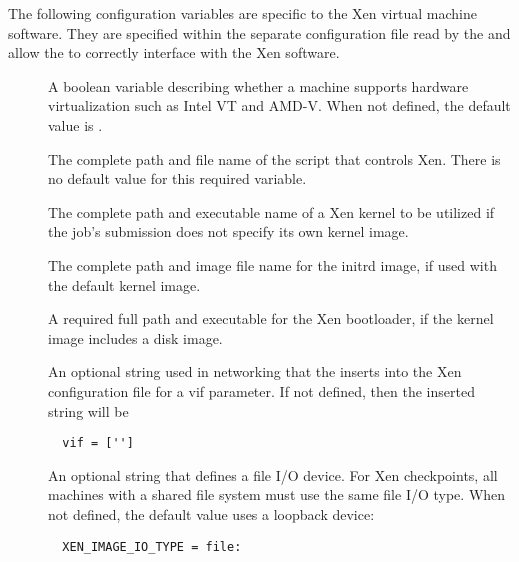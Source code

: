 The following configuration variables are specific to the Xen
virtual machine software.  They are specified within the separate configuration
file read by the  and allow the  to
correctly interface with the Xen software.

\begin{description}

\item[]
\label{param:VMHardwareVT}
A boolean variable describing whether a machine supports
hardware virtualization such as Intel VT and AMD-V.
When not defined, the default value is .

\item[]
  \label{param:XenScript}
  The complete path and file name of the script that controls Xen.
  There is no default value for this required variable.

\item[]
  \label{param:XenDefaultKernel}
  The complete path and executable name of a Xen kernel to be utilized
  if the job's submission does not specify its own kernel image.

\item[]
  \label{param:XenDefaultRAMDisk}
  The complete path and image file name for the initrd image,
  if used with the default kernel image.

\item[]
  \label{param:XenBootloader}
  A required full path and executable for the Xen bootloader,
  if the kernel image includes a disk image.

\item[]
  \label{param:XenVIFParameter}
  An optional string used in networking that the 
  inserts into the Xen configuration file for a vif parameter.
  If not defined, then the inserted string will be
  \begin{verbatim}
  vif = ['']
  \end{verbatim}

\item[]
  \label{param:XenImageIOType}
  An optional string that defines a file I/O device.
  For Xen checkpoints, all machines with a shared file system must
  use the same file I/O type.
  When not defined, the default value uses a loopback device:
  \begin{verbatim}
  XEN_IMAGE_IO_TYPE = file:
  \end{verbatim}


\end{description}
